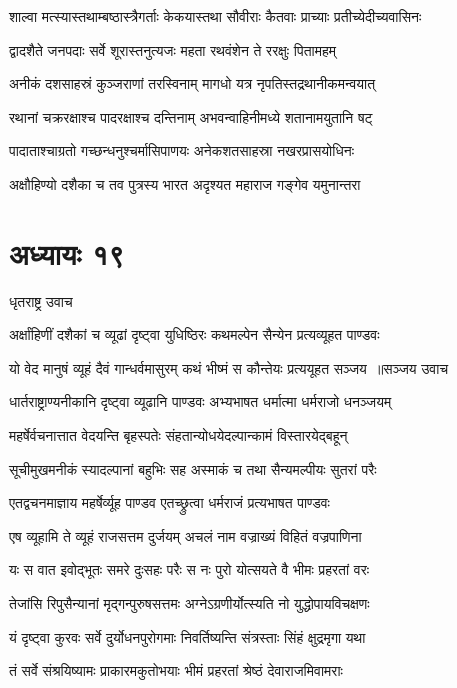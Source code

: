 \twolineshloka
{शाल्वा मत्स्यास्तथाम्बष्ठास्त्रैगर्ताः केकयास्तथा}
{सौवीराः कैतवाः प्राच्याः प्रतीच्येदीच्यवासिनः}


\twolineshloka
{द्वादशैते जनपदाः सर्वे शूरास्तनुत्यजः}
{महता रथवंशेन ते ररक्षुः पितामहम्}


\twolineshloka
{अनीकं दशसाहस्रं कुञ्जराणां तरस्विनाम्}
{मागधो यत्र नृपतिस्तद्रथानीकमन्वयात्}


\twolineshloka
{रथानां चक्ररक्षाश्च पादरक्षाश्च दन्तिनाम्}
{अभवन्वाहिनीमध्ये शतानामयुतानि षट्}


\twolineshloka
{पादाताश्चाग्रतो गच्छन्धनुश्चर्मासिपाणयः}
{अनेकशतसाहस्रा नखरप्रासयोधिनः}


\twolineshloka
{अक्षौहिण्यो दशैका च तव पुत्रस्य भारत}
{अदृश्यत महाराज गङ्गेव यमुनान्तरा}


\chapter{अध्यायः १९}
\twolineshloka
{धृतराष्ट्र उवाच}
{}


\twolineshloka
{अर्क्षांहिणीं दशैकां च व्यूढां दृष्ट्वा युधिष्ठिरः}
{कथमल्पेन सैन्येन प्रत्यव्यूहत पाण्डवः}


\threelineshloka
{यो वेद मानुषं व्यूहं दैवं गान्धर्वमासुरम्}
{कथं भीष्मं स कौन्तेयः प्रत्ययूहत सञ्जय ॥सञ्जय उवाच}
{}


\twolineshloka
{धार्तराष्ट्राण्यनीकानि दृष्ट्वा व्यूढानि पाण्डवः}
{अभ्यभाषत धर्मात्मा धर्मराजो धनञ्जयम्}


\twolineshloka
{महर्षेर्वचनात्तात वेदयन्ति बृहस्पतेः}
{संहतान्योधयेदल्पान्कामं विस्तारयेद्बहून्}


\twolineshloka
{सूचीमुखमनीकं स्यादल्पानां बहुभिः सह}
{अस्माकं च तथा सैन्यमल्पीयः सुतरां परैः}


\twolineshloka
{एतद्वचनमाज्ञाय महर्षेर्व्यूह पाण्डव}
{एतच्छ्रुत्वा धर्मराजं प्रत्यभाषत पाण्डवः}


\twolineshloka
{एष व्यूहामि ते व्यूहं राजसत्तम दुर्जयम्}
{अचलं नाम वज्राख्यं विहितं वज्रपाणिना}


\twolineshloka
{यः स वात इवोद्भूतः समरे दुःसहः परैः}
{स नः पुरो योत्सयते वै भीमः प्रहरतां वरः}


\twolineshloka
{तेजांसि रिपुसैन्यानां मृद्गन्पुरुषसत्तमः}
{अग्नेऽग्रणीर्योत्स्यति नो युद्धोपायविचक्षणः}


\twolineshloka
{यं दृष्ट्वा कुरवः सर्वे दुर्योधनपुरोगमाः}
{निवर्तिष्यन्ति संत्रस्ताः सिंहं क्षुद्रमृगा यथा}


\twolineshloka
{तं सर्वे संश्रयिष्यामः प्राकारमकुतोभयाः}
{भीमं प्रहरतां श्रेष्ठं देवाराजमिवामराः}


